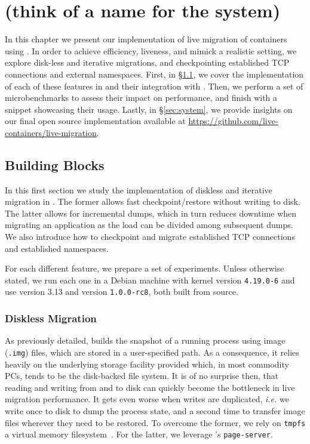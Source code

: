 \chapter{\projName (think of a name for the system)} \label{chap:system}

In this chapter we present our implementation of live migration of \runc containers using \criu.
In order to achieve efficiency, liveness, and mimick a realistic setting, we explore disk-less and iterative migrations, and checkpointing established TCP connections and external namespaces.
First, in \S\ref{sec:arch-blocks}, we cover the implementation of each of these features in \criu and their integration with \runc.
Then, we perform a set of microbenchmarks to assess their impact on performance, and finish with a snippet showcasing their usage.
Lastly, in \S\ref{sec:system}, we provide insights on our final open source implementation available at \url{https://github.com/live-containers/live-migration}.

\section{Building Blocks} \label{sec:arch-blocks}

In this first section we study the implementation of diskless and iterative migration in \criu.
The former allows fast checkpoint/restore without writing to disk.
The latter allows for incremental dumps, which in turn reduces downtime when migrating an application as the load can be divided among subsequent dumps.
We also introduce how to checkpoint and migrate established TCP connections and established namespaces.

For each different feature, we prepare a set of experiments.
Unless otherwise stated, we run each one in a Debian machine with kernel version \texttt{4.19.0-6} and use \criu version 3.13 and \runc version \texttt{1.0.0-rc8}, both built from source.

\subsection{Diskless Migration}

As previously detailed, \criu builds the snapshot of a running process using image (\texttt{.img}) files, which are stored in a user-specified path.
As a consequence, it relies heavily on the underlying storage facility provided which, in most commodity PCs, tends to be the disk-backed file system.
It is of no surprise then, that reading and writing from and to disk can quickly become the bottleneck in live migration performance.
It gets even worse when writes are duplicated, \textit{i.e.} we write once to disk to dump the process state, and a second time to transfer image files wherever they need to be restored.
To overcome the former, we rely on \texttt{tmpfs} a virtual memory filesystem~\cite{tmpfs-manpage}.
For the latter, we leverage \criu's \texttt{page-server}.

